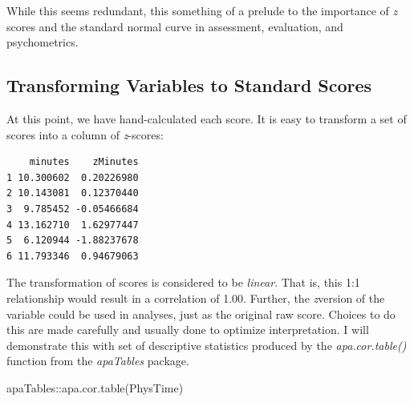 \documentclass[
  11pt,
]{book}
\newenvironment{Shaded}{\begin{snugshade}}{\end{snugshade}}
\newcommand{\FunctionTok}[1]{\textcolor[rgb]{0.00,0.00,0.00}{#1}}
\newcommand{\NormalTok}[1]{#1}
\newcommand{\OtherTok}[1]{\textcolor[rgb]{0.56,0.35,0.01}{#1}}
\newcommand{\SpecialCharTok}[1]{\textcolor[rgb]{0.00,0.00,0.00}{#1}}
\begin{document}
While this seems redundant, this something of a prelude to the importance of \emph{z} scores and the standard normal curve in assessment, evaluation, and psychometrics.

\hypertarget{transforming-variables-to-standard-scores}{%
\subsection{Transforming Variables to Standard Scores}\label{transforming-variables-to-standard-scores}}

At this point, we have hand-calculated each score. It is easy to transform a set of scores into a column of \emph{z}-scores:

\begin{Shaded}
\end{Shaded}

\begin{verbatim}
    minutes    zMinutes
1 10.300602  0.20226980
2 10.143081  0.12370440
3  9.785452 -0.05466684
4 13.162710  1.62977447
5  6.120944 -1.88237678
6 11.793346  0.94679063
\end{verbatim}

The transformation of scores is considered to be \emph{linear}. That is, this 1:1 relationship would result in a correlation of 1.00. Further, the \emph{z}version of the variable could be used in analyses, just as the original raw score. Choices to do this are made carefully and usually done to optimize interpretation. I will demonstrate this with set of descriptive statistics produced by the \emph{apa.cor.table()} function from the \emph{apaTables} package.

\begin{Shaded}
\begin{Highlighting}[]
\NormalTok{apaTables}\SpecialCharTok{::}\FunctionTok{apa.cor.table}\NormalTok{(PhysTime)}
\end{Highlighting}
\end{Shaded}
\end{document}
